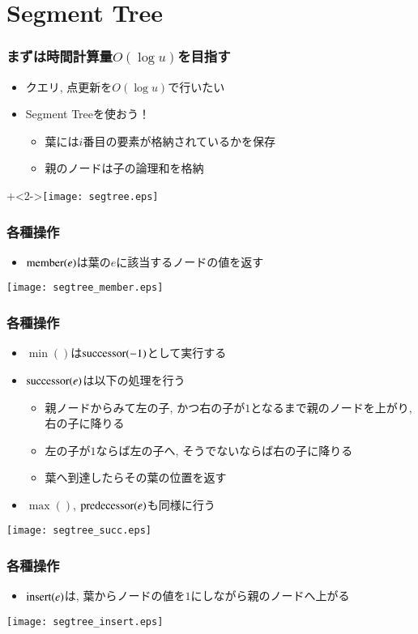 \documentclass[dvipdfmx,12pt,notheorems]{beamer}
\theoremstyle{definition}
\newcommand{\func}[1]{\ensuremath\mathrm{#1}}
\begin{document}
\section{Segment Tree}
\begin{frame}\frametitle{まずは時間計算量$O(\log u)$を目指す}
\begin{itemize}
\item クエリ, 点更新を$O(\log u)$で行いたい
\item Segment Treeを使おう！
\begin{itemize}
\item 葉には$i$番目の要素が格納されているかを保存
\item 親のノードは子の論理和を格納
\end{itemize}
\end{itemize}
\onslide+<2->{\texttt{[image: segtree.eps]}}
\end{frame}

\begin{frame}\frametitle{各種操作}
\begin{itemize}
\item $\func{member}(e)$は葉の$e$に該当するノードの値を返す
\end{itemize}
\texttt{[image: segtree\_member.eps]}
\end{frame}

\begin{frame}\frametitle{各種操作}
\begin{itemize}
\item $\min()$は$\func{successor}(-1)$として実行する
\item $\func{successor}(e)$は以下の処理を行う
\begin{itemize}
\item 親ノードからみて左の子, かつ右の子が$1$となるまで親のノードを上がり, 右の子に降りる
\item 左の子が$1$ならば左の子へ, そうでないならば右の子に降りる
\item 葉へ到達したらその葉の位置を返す
\end{itemize}
\item $\max()$, $\func{predecessor}(e)$も同様に行う
\end{itemize}
\texttt{[image: segtree\_succ.eps]}
\end{frame}

\begin{frame}\frametitle{各種操作}
\begin{itemize}
\item $\func{insert}(e)$は, 葉からノードの値を$1$にしながら親のノードへ上がる
\end{itemize}
\texttt{[image: segtree\_insert.eps]}
\end{frame}
\end{document}
